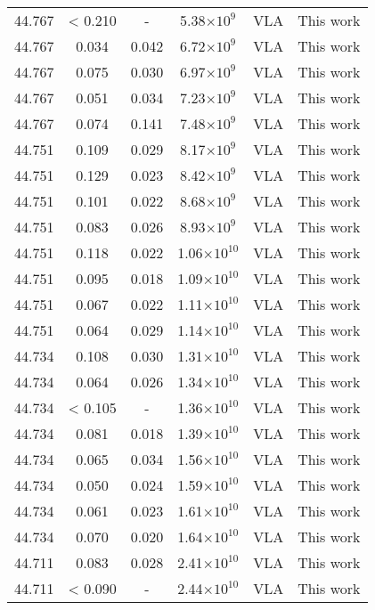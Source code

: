 \documentclass{aa}
\begin{document}
{\begin{longtable}{c|c|c|c|c|c}
 44.767 &   < 0.210 &  -     &  5.38$\times 10^{9}$  &  VLA & This work \\
 44.767 &   0.034   &  0.042 &  6.72$\times 10^{9}$  &  VLA & This work \\
 44.767 &   0.075   &  0.030 &  6.97$\times 10^{9}$  &  VLA & This work \\
 44.767 &   0.051   &  0.034 &  7.23$\times 10^{9}$  &  VLA & This work \\
 44.767 &   0.074   &  0.141 &  7.48$\times 10^{9}$  &  VLA & This work \\
 44.751 &   0.109   &  0.029 &  8.17$\times 10^{9}$  &  VLA & This work \\
 44.751 &   0.129   &  0.023 &  8.42$\times 10^{9}$  &  VLA & This work \\
 44.751 &   0.101   &  0.022 &  8.68$\times 10^{9}$  &  VLA & This work \\
 44.751 &   0.083   &  0.026 &  8.93$\times 10^{9}$  &  VLA & This work \\
 44.751 &   0.118   &  0.022 &  1.06$\times 10^{10}$ &  VLA & This work \\
 44.751 &   0.095   &  0.018 &  1.09$\times 10^{10}$ &  VLA & This work \\
 44.751 &   0.067   &  0.022 &  1.11$\times 10^{10}$ &  VLA & This work \\
 44.751 &   0.064   &  0.029 &  1.14$\times 10^{10}$ &  VLA & This work \\
 44.734 &   0.108   &  0.030 &  1.31$\times 10^{10}$ &  VLA & This work \\
 44.734 &   0.064   &  0.026 &  1.34$\times 10^{10}$ &  VLA & This work \\
 44.734 &   < 0.105 &  -     &  1.36$\times 10^{10}$ &  VLA & This work \\
 44.734 &   0.081   &  0.018 &  1.39$\times 10^{10}$ &  VLA & This work \\
 44.734 &   0.065   &  0.034 &  1.56$\times 10^{10}$ &  VLA & This work \\
 44.734 &   0.050   &  0.024 &  1.59$\times 10^{10}$ &  VLA & This work \\
 44.734 &   0.061   &  0.023 &  1.61$\times 10^{10}$ &  VLA & This work \\
 44.734 &   0.070   &  0.020 &  1.64$\times 10^{10}$ &  VLA & This work \\
 44.711 &   0.083   &  0.028 &  2.41$\times 10^{10}$ &  VLA & This work \\
 44.711 &   < 0.090 &  -     &  2.44$\times 10^{10}$ &  VLA & This work \\

\end{longtable}}
\end{document}
